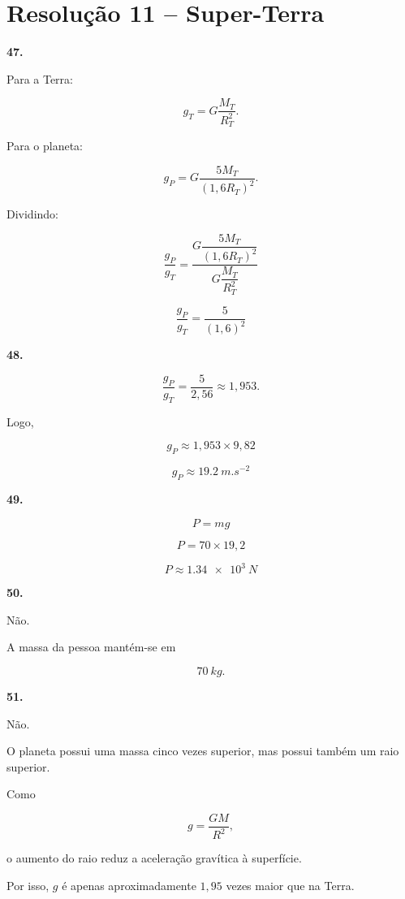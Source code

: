 \documentclass[11pt,a4paper]{article}
\begin{document}
	\section*{Resolução 11 -- Super-Terra}
	
	\begin{solucaobox}[Questões 47--51]
		
		\textbf{47.}
		
		Para a Terra:
		
		\[
		g_T=
		G\frac{M_T}{R_T^2}.
		\]
		
		Para o planeta:
		
		\[
		g_P=
		G\frac{5M_T}{(1{,}6R_T)^2}.
		\]
		
		Dividindo:
		
		\[
		\frac{g_P}{g_T}
		=
		\frac{
			G\dfrac{5M_T}{(1{,}6R_T)^2}
		}{
			G\dfrac{M_T}{R_T^2}
		}
		\]
		
		\[
		\boxed{
			\frac{g_P}{g_T}
			=
			\frac{5}{(1{,}6)^2}
		}
		\]
		
		\vspace{3mm}
		
		\textbf{48.}
		
		\[
		\frac{g_P}{g_T}
		=
		\frac{5}{2{,}56}
		\approx1{,}953.
		\]
		
		Logo,
		
		\[
		g_P
		\approx
		1{,}953\times9{,}82
		\]
		
		\[
		\boxed{
			g_P\approx\SI{19.2}{m.s^{-2}}
		}
		\]
		
		\vspace{3mm}
		
		\textbf{49.}
		
		\[
		P=mg
		\]
		
		\[
		P=
		70\times19{,}2
		\]
		
		\[
		\boxed{
			P\approx\SI{1.34e3}{N}
		}
		\]
		
		\vspace{3mm}
		
		\textbf{50.}
		
		Não.
		
		A massa da pessoa mantém-se em
		
		\[
		\boxed{
			\SI{70}{kg}
		}.
		\]
		
		\vspace{3mm}
		
		\textbf{51.}
		
		Não.
		
		O planeta possui uma massa cinco vezes superior, mas possui também um
		raio superior.
		
		Como
		
		\[
		g=
		\frac{GM}{R^2},
		\]
		
		o aumento do raio reduz a aceleração gravítica à superfície.
		
		Por isso, $g$ é apenas aproximadamente $1{,}95$ vezes maior que na Terra.
		
	\end{solucaobox}
	
\end{document}
